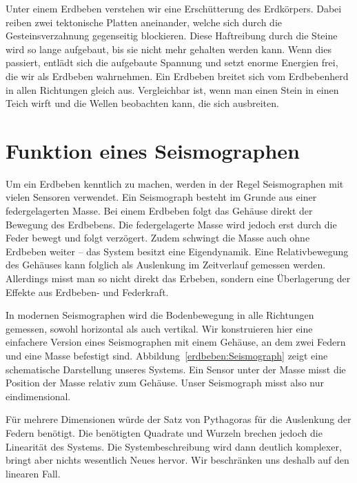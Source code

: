 %
%
Unter einem Erdbeben verstehen wir eine Erschütterung des Erdkörpers.
%
Dabei reiben zwei tektonische Platten aneinander, welche sich durch die Gesteinsverzahnung gegenseitig blockieren.
%
Diese Haftreibung durch die Steine wird so lange aufgebaut, bis sie nicht mehr gehalten werden kann.
Wenn dies passiert, entlädt sich die aufgebaute Spannung und setzt enorme Energien frei, die wir als Erdbeben wahrnehmen.
Ein Erdbeben breitet sich vom Erdbebenherd in allen Richtungen gleich aus.
%
Vergleichbar ist, wenn man einen Stein in einen Teich wirft und die Wellen beobachten kann, die sich ausbreiten.

\section{Funktion eines Seismographen}
%
%
Um ein Erdbeben kenntlich zu machen, werden in der Regel Seismographen mit vielen Sensoren verwendet. 
%
Ein Seismograph besteht im Grunde aus einer federgelagerten Masse.
Bei einem Erdbeben folgt das Gehäuse direkt der Bewegung des Erdbebens.
Die federgelagerte Masse wird jedoch erst durch die Feder bewegt und folgt verzögert.
Zudem schwingt die Masse auch ohne Erdbeben weiter -- das System besitzt eine Eigendynamik.
Eine Relativbewegung des Gehäuses kann folglich als Auslenkung im Zeitverlauf gemessen werden.
Allerdings misst man so nicht direkt das Erbeben, sondern eine Überlagerung der Effekte aus Erdbeben- und Federkraft.

In modernen Seismographen wird die Bodenbewegung in alle Richtungen gemessen,
sowohl horizontal als auch vertikal. 
Wir konstruieren hier eine einfachere Version eines Seismographen mit einem Gehäuse,
an dem zwei Federn und eine Masse befestigt sind. 
Abbildung~\ref{erdbeben:Seismograph} zeigt eine schematische Darstellung unseres Systems.
Ein Sensor unter der Masse misst die Position der Masse relativ zum Gehäuse.
Unser Seismograph misst also nur eindimensional.

Für mehrere Dimensionen würde der Satz von Pythagoras für die Auslenkung der Federn benötigt.
Die benötigten Quadrate und Wurzeln brechen jedoch die Linearität des Systems.
Die Systembeschreibung wird dann deutlich komplexer, bringt aber nichts wesentlich Neues hervor.
Wir beschränken uns deshalb auf den linearen Fall.

